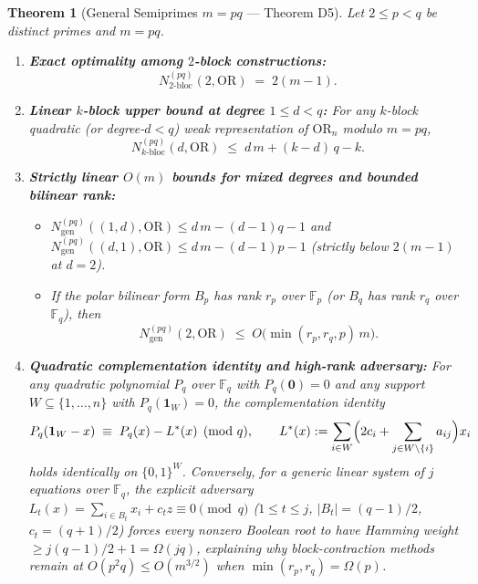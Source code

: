 \documentclass[11pt,a4paper]{article}
\newtheorem{theorem}{Theorem}[section]
\theoremstyle{definition}
\newcommand{\F}{\mathbb{F}}
\newcommand{\OR}{\mathrm{OR}}
\newcommand{\Ngen}{N_{\mathrm{gen}}}
\newcommand{\Ntwobloc}{N_{\mathrm{2\text{-}bloc}}}
\begin{document}
\begin{theorem}[General Semiprimes $m = pq$ --- Theorem D5]
\label{thm:d5}
Let $2 \le p < q$ be distinct primes and $m = pq$.
\begin{enumerate}[leftmargin=*,nosep]
  \item \textbf{Exact optimality among $2$-block constructions:}
  \[
    \Ntwobloc^{(pq)}(2, \OR) \;=\; 2(m - 1).
  \]
  \item \textbf{Linear $k$-block upper bound at degree $1 \le d < q$:} For any $k$-block quadratic (or degree-$d < q$) weak representation of $\OR_n$ modulo $m = pq$,
  \[
    N_{k\text{-bloc}}^{(pq)}(d, \OR) \;\le\; d\, m + (k - d)\, q - k.
  \]
  \item \textbf{Strictly linear $O(m)$ bounds for mixed degrees and bounded bilinear rank:}
  \begin{itemize}[nosep]
    \item $\Ngen^{(pq)}((1, d), \OR) \le d\, m - (d-1)q - 1$ and $\Ngen^{(pq)}((d, 1), \OR) \le d\, m - (d-1)p - 1$ (strictly below $2(m-1)$ at $d = 2$).
    \item If the polar bilinear form $B_p$ has rank $r_p$ over $\F_p$ (or $B_q$ has rank $r_q$ over $\F_q$), then
    \[
      \Ngen^{(pq)}(2, \OR) \;\le\; O\bigl(\min(r_p, r_q, p)\, m\bigr).
    \]
  \end{itemize}
  \item \textbf{Quadratic complementation identity and high-rank adversary:} For any quadratic polynomial $P_q$ over $\F_q$ with $P_q(\mathbf{0}) = 0$ and any support $W \subseteq \{1,\dots,n\}$ with $P_q(\mathbf{1}_W) = 0$, the complementation identity
  \[
    P_q(\mathbf{1}_W - x) \;\equiv\; P_q(x) - L^*(x) \pmod q,
    \qquad L^*(x) := \sum_{i \in W} \Bigl(2 c_i + \sum_{j \in W \setminus \{i\}} a_{ij}\Bigr) x_i
  \]
  holds identically on $\{0,1\}^W$. Conversely, for a generic linear system of $j$ equations over $\F_q$, the explicit adversary $L_t(x) = \sum_{i \in B_t} x_i + c_t z \equiv 0 \pmod q$ ($1 \le t \le j$, $|B_t| = (q-1)/2$, $c_t = (q+1)/2$) forces every nonzero Boolean root to have Hamming weight $\ge j(q-1)/2 + 1 = \Omega(jq)$, explaining why block-contraction methods remain at $O(p^2 q) \le O(m^{3/2})$ when $\min(r_p, r_q) = \Omega(p)$.
\end{enumerate}
\end{theorem}
\end{document}
